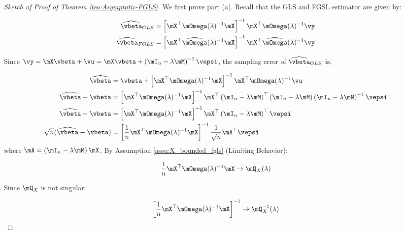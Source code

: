 \documentclass[english,12pt]{book}\usepackage[]{graphicx}\usepackage[]{xcolor}
\begin{document}
\begin{proof}[Sketch of Proof of Theorem \ref{teo:Asymptotic-FGLS}]
We first prove part (a). Recall that the GLS and FGSL estimator are given by:

\begin{equation*}
\begin{aligned}
\widehat{\vbeta}_{GLS} & = \left[\mX^\top\mOmega(\lambda)^{-1}\mX\right]^{-1}\mX^\top\mOmega(\lambda)^{-1}\vy \\
\widehat{\vbeta}_{FGLS} & = \left[\mX^\top\widehat{\mOmega}(\lambda)^{-1}\mX\right]^{-1}\mX^\top\widehat{\mOmega}(\lambda)^{-1}\vy
\end{aligned}
\end{equation*}

Since $\vy = \mX\vbeta + \vu = \mX\vbeta + \left(\mI_n-\lambda\mM\right)^{-1}\vepsi$, the sampling error of $\widehat{\vbeta}_{GLS}$ is,

\begin{equation*}
  \begin{aligned}
  \widehat{\vbeta} & = \vbeta + \left[\mX^\top\mOmega(\lambda)^{-1}\mX\right]^{-1}\mX^\top\mOmega(\lambda)^{-1}\vu \\
  \widehat{\vbeta} - \vbeta & =  \left[\mX^\top\mOmega(\lambda)^{-1}\mX\right]^{-1}\mX^\top\left(\mI_n - \lambda\mM\right)^\top\left(\mI_n - \lambda\mM\right)\left(\mI_n - \lambda\mM\right)^{-1}\vepsi \\
  \widehat{\vbeta} - \vbeta & =  \left[\mX^\top\mOmega(\lambda)^{-1}\mX\right]^{-1}\mX^\top\left(\mI_n - \lambda\mM\right)^\top\vepsi \\
  \sqrt{n}(\widehat{\vbeta} - \vbeta) & =  \left[\frac{1}{n}\mX^\top\mOmega(\lambda)^{-1}\mX\right]^{-1}\frac{1}{\sqrt{n}}\mA^\top\vepsi 
  \end{aligned}
\end{equation*}
%
where $\mA = \left(\mI_n - \lambda\mM\right)\mX$. By Assumption \ref{assu:X_bounded_fgls} (Limiting Behavior): 

\begin{equation*}
  \frac{1}{n}\mX^\top\mOmega(\lambda)^{-1}\mX \to \mQ_X(\lambda)
\end{equation*}

Since $\mQ_X$ is not singular:

\begin{equation*}
  \left[\frac{1}{n}\mX^\top\mOmega(\lambda)^{-1}\mX\right]^{-1} \to \mQ_X^{-1}(\lambda)
\end{equation*}


\end{proof}
\end{document}
